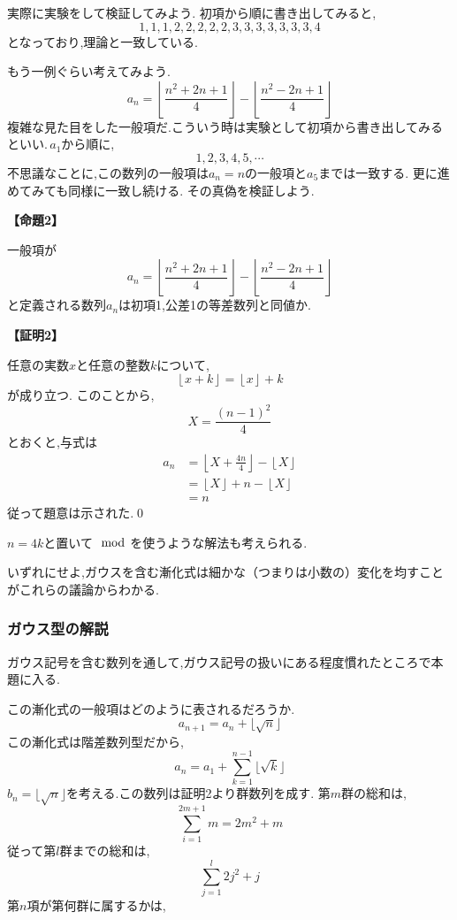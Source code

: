     実際に実験をして検証してみよう.
    初項から順に書き出してみると,
    \[
      1,1,1,2,2,2,2,2,3,3,3,3,3,3,3,4
    \]
    となっており,理論と一致している.

    もう一例ぐらい考えてみよう.
    \[
      a_{n}=\left\lfloor \frac{n^2+2n+1}{4} \right\rfloor -\left\lfloor \frac{n^2-2n+1}{4} \right\rfloor
    \]
    複雑な見た目をした一般項だ.こういう時は実験として初項から書き出してみるといい.\,$a_1$から順に,
    \[
      1,2,3,4,5,\cdots
    \]
    不思議なことに,この数列の一般項は$a_n=n$の一般項と$a_5$までは一致する.
    更に進めてみても同様に一致し続ける.
    その真偽を検証しよう.

    \noindent \textbf{【命題2】}
    \begin{smallquote}
      一般項が
      \[
        a_{n}=\left\lfloor \frac{n^2+2n+1}{4} \right\rfloor -\left\lfloor \frac{n^2-2n+1}{4} \right\rfloor
      \]
      と定義される数列$a_n$は初項1,公差1の等差数列と同値か.
    \end{smallquote}
    \noindent \textbf{【証明2】}
    \begin{smallquote}
      任意の実数$x$と任意の整数$k$について,
      \[
        \left\lfloor x+k \right\rfloor=\left\lfloor x \right\rfloor +k
      \]
      が成り立つ.
      このことから,
      \[
        X=\frac{(n-1)^2}{4}
      \]
      とおくと,与式は
      \begin{align*}
        a_n & =\left\lfloor X+\frac{4n}{4} \right\rfloor-\left\lfloor X \right\rfloor \\
            & =\left\lfloor X \right\rfloor+n-\left\lfloor X \right\rfloor            \\
            & =n
      \end{align*}
      従って題意は示された.\qed
    \end{smallquote}
    $n=4k$と置いて$\mod$を使うような解法も考えられる.

    いずれにせよ,ガウスを含む漸化式は細かな（つまりは小数の）変化を均すことがこれらの議論からわかる.

  \subsubsection{ガウス型の解説}
    ガウス記号を含む数列を通して,ガウス記号の扱いにある程度慣れたところで本題に入る.

    この漸化式の一般項はどのように表されるだろうか.
    \[
      a_{n+1}=a_n+\lfloor \sqrt{n} \rfloor
    \]
    この漸化式は階差数列型だから,
    \[
      a_n=a_1+\sum_{k=1}^{n-1} \lfloor \sqrt{k} \rfloor
    \]
    $b_n=\lfloor \sqrt{n} \rfloor$を考える.この数列は証明2より群数列を成す.
    第$m$群の総和は,
    \[
      \sum_{i=1}^{2m+1} m=2m^2+m
    \]
    従って第$l$群までの総和は,
    \[
      \sum_{j=1}^{l}  2j^2+j
    \]
    第$n$項が第何群に属するかは,
